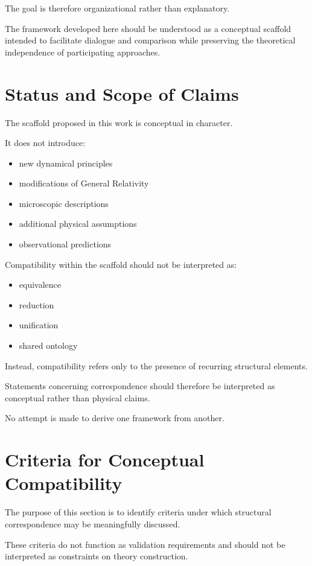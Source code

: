 \documentclass[12pt,a4paper]{article}
\begin{document}
The goal is therefore organizational rather than explanatory.

The framework developed here should be understood as a conceptual scaffold intended to facilitate dialogue and comparison while preserving the theoretical independence of participating approaches.

\section{Status and Scope of Claims}

The scaffold proposed in this work is conceptual in character.

It does not introduce:

\begin{itemize}
  \item new dynamical principles
  \item modifications of General Relativity
  \item microscopic descriptions
  \item additional physical assumptions
  \item observational predictions
\end{itemize}

Compatibility within the scaffold should not be interpreted as:

\begin{itemize}
  \item equivalence
  \item reduction
  \item unification
  \item shared ontology
\end{itemize}

Instead, compatibility refers only to the presence of recurring structural elements.

Statements concerning correspondence should therefore be interpreted as conceptual rather than physical claims.

No attempt is made to derive one framework from another.

\section{Criteria for Conceptual Compatibility}

The purpose of this section is to identify criteria under which structural correspondence may be meaningfully discussed.

These criteria do not function as validation requirements and should not be interpreted as constraints on theory construction.
\end{document}
